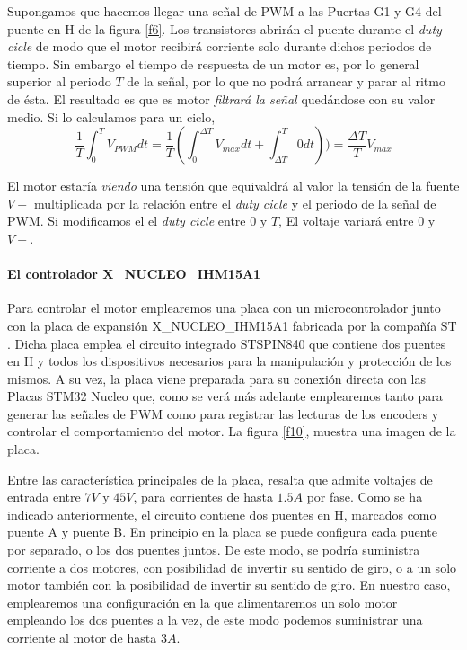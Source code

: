 \documentclass[10pt,a4paper]{report}
\begin{document}
Supongamos que hacemos llegar una señal de PWM a las Puertas G1 y G4 del puente en H de la figura \ref{f6}. Los transistores abrirán el puente durante el \emph{duty cicle} de modo que el motor recibirá corriente solo durante dichos periodos de tiempo. Sin embargo el tiempo de respuesta de un motor es, por lo general superior al periodo $T$ de la señal, por lo que no podrá arrancar y parar al ritmo de ésta. El resultado es que es motor \emph{filtrará la señal} quedándose con su valor medio. Si lo calculamos para un ciclo,
\begin{equation}
\frac{1}{T}\int^T_0 V_{PWM}dt = \frac{1}{T}\left(\int^{\Delta T}_0 V_{max}dt 
+ \int^{T}_{\Delta T} 0 dt\right)) = \frac{\Delta T}{T}V_{max}
\end{equation}

El motor estaría  \emph{viendo} una tensión que equivaldrá al valor la tensión de la fuente $V+$ multiplicada por la relación entre el \emph{duty cicle} y el periodo de la señal de PWM. Si modificamos el el \emph{duty cicle} entre $0$ y $T$, El voltaje variará entre $0$ y $V+$.

\paragraph{El controlador X\_NUCLEO\_IHM15A1} Para controlar el motor emplearemos una placa con un microcontrolador junto con  la placa de expansión X\_NUCLEO\_IHM15A1 fabricada por la compañía ST \cite{IHM15}. Dicha placa emplea el circuito integrado  STSPIN840  \cite{STSPIN840} que contiene dos puentes en H y todos los dispositivos necesarios para la manipulación y protección de los mismos. A su vez, la placa viene preparada para su conexión directa con las Placas STM32 Nucleo que, como se verá más adelante emplearemos tanto para generar las señales de PWM como para registrar las lecturas de los encoders y controlar el comportamiento del motor. La figura \ref{f10}, muestra una imagen de la placa. 

Entre las característica principales de la placa, resalta que admite voltajes de entrada entre $7V$ y $45V$, para corrientes de hasta $1.5 A$ por fase. Como se ha indicado anteriormente, el circuito contiene dos puentes en H, marcados como puente A y puente B.  En principio en la placa se puede configura  cada puente por separado, o los dos puentes juntos. De este modo, se podría suministra corriente a dos motores, con posibilidad de invertir su sentido de giro, o a un solo motor también con la posibilidad de invertir su sentido de giro. En nuestro caso, emplearemos  una configuración en la que alimentaremos un solo motor empleando los dos puentes a la vez, de este modo podemos suministrar una corriente al motor de hasta $3 A$.  
\end{document}
